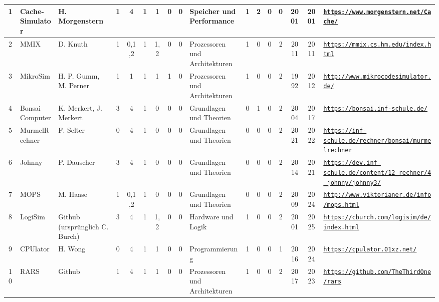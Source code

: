 \begin{landscape}
\begin{longtable}{|c|p{1cm}|p{1.3cm}|c|c|c|c|c|c|p{1.3cm}|c|c|c|c|c|c|p{2cm}|}
    1 & Cache-Simulator & H. Morgenstern & 1 & 4 & 1 & 1 & 0 & 0 & Speicher und Performance & 1 & 2 & 0 & 0 & 2001 & 2001 & \href{https://www.morgenstern.net/Cache/}{\nolinkurl{https://www.morgenstern.net/Cache/}} \\ \hline
    2 & MMIX & D. Knuth & 1 & 0,1,2 & 1 & 1,2 & 0 & 0 & Prozessoren und Architekturen & 1 & 0 & 0 & 2 & 2011 & 2011 & \href{https://mmix.cs.hm.edu/index.html}{\nolinkurl{https://mmix.cs.hm.edu/index.html}} \\ \hline
    3 & MikroSim & H. P. Gumm, M. Perner & 1 & 1 & 1 & 1 & 1 & 0 & Prozessoren und Architekturen & 1 & 0 & 0 & 2 & 1992 & 2012 & \href{http://www.mikrocodesimulator.de/}{\nolinkurl{http://www.mikrocodesimulator.de/}} \\ \hline
    4 & Bonsai Computer & K. Merkert, J. Merkert & 3 & 4 & 1 & 0 & 0 & 0 & Grundlagen und Theorien & 0 & 1 & 0 & 2 & 2004 & 2017 & \href{https://bonsai.inf-schule.de/}{\nolinkurl{https://bonsai.inf-schule.de/}} \\ \hline
    5 & MurmelRechner & F. Selter & 0 & 4 & 1 & 0 & 0 & 0 & Grundlagen und Theorien & 0 & 0 & 0 & 2 & 2021 & 2022 & \href{https://inf-schule.de/rechner/bonsai/murmelrechner}{\nolinkurl{https://inf-schule.de/rechner/bonsai/murmelrechner}} \\ \hline
    6 & Johnny & P. Dauscher & 3 & 4 & 1 & 0 & 0 & 0 & Grundlagen und Theorien & 0 & 0 & 0 & 2 & 2014 & 2021 & \href{https://dev.inf-schule.de/content/12\_rechner/4\_johnny/johnny3/}{\nolinkurl{https://dev.inf-schule.de/content/12\_rechner/4\_johnny/johnny3/}} \\ \hline
    7 & MOPS & M. Haase & 1 & 0,1,2 & 1 & 0 & 0 & 0 & Grundlagen und Theorien & 0 & 0 & 0 & 2 & 2009 & 2024 & \href{http://www.viktorianer.de/info/mops.html}{\nolinkurl{http://www.viktorianer.de/info/mops.html}} \\ \hline
    8 & LogiSim & Github (ursprünglich C. Burch) & 3 & 4 & 1 & 1,2 & 0 & 0 & Hardware und Logik & 1 & 0 & 0 & 2 & 2001 & 2025 & \href{https://cburch.com/logisim/de/index.html}{\nolinkurl{https://cburch.com/logisim/de/index.html}} \\ \hline
    9 & CPUlator & H. Wong & 0 & 4 & 1 & 1 & 0 & 0 & Programmierung & 1 & 0 & 0 & 1 & 2016 & 2024 & \href{https://cpulator.01xz.net/}{\nolinkurl{https://cpulator.01xz.net/}} \\ \hline
    10 & RARS & Github & 1 & 4 & 1 & 1 & 0 & 0 & Prozessoren und Architekturen & 1 & 0 & 0 & 2 & 2017 & 2023 & \href{https://github.com/TheThirdOne/rars}{\nolinkurl{https://github.com/TheThirdOne/rars}} \\ \hline

\end{longtable}
\end{landscape}
